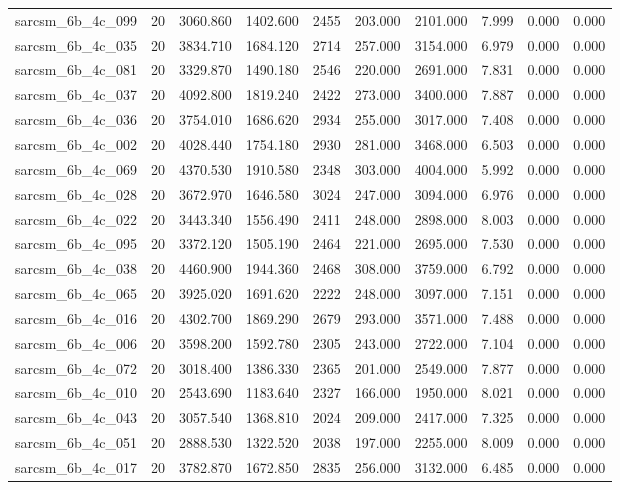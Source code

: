 \begin{tabular}{lrrrrrrrrr}
sarcsm\_6b\_4c\_099 & 20 & 3060.860 & 1402.600 & 2455 & 203.000 & 2101.000 & 7.999 & 0.000 & 0.000 \\
sarcsm\_6b\_4c\_035 & 20 & 3834.710 & 1684.120 & 2714 & 257.000 & 3154.000 & 6.979 & 0.000 & 0.000 \\
sarcsm\_6b\_4c\_081 & 20 & 3329.870 & 1490.180 & 2546 & 220.000 & 2691.000 & 7.831 & 0.000 & 0.000 \\
sarcsm\_6b\_4c\_037 & 20 & 4092.800 & 1819.240 & 2422 & 273.000 & 3400.000 & 7.887 & 0.000 & 0.000 \\
sarcsm\_6b\_4c\_036 & 20 & 3754.010 & 1686.620 & 2934 & 255.000 & 3017.000 & 7.408 & 0.000 & 0.000 \\
sarcsm\_6b\_4c\_002 & 20 & 4028.440 & 1754.180 & 2930 & 281.000 & 3468.000 & 6.503 & 0.000 & 0.000 \\
sarcsm\_6b\_4c\_069 & 20 & 4370.530 & 1910.580 & 2348 & 303.000 & 4004.000 & 5.992 & 0.000 & 0.000 \\
sarcsm\_6b\_4c\_028 & 20 & 3672.970 & 1646.580 & 3024 & 247.000 & 3094.000 & 6.976 & 0.000 & 0.000 \\
sarcsm\_6b\_4c\_022 & 20 & 3443.340 & 1556.490 & 2411 & 248.000 & 2898.000 & 8.003 & 0.000 & 0.000 \\
sarcsm\_6b\_4c\_095 & 20 & 3372.120 & 1505.190 & 2464 & 221.000 & 2695.000 & 7.530 & 0.000 & 0.000 \\
sarcsm\_6b\_4c\_038 & 20 & 4460.900 & 1944.360 & 2468 & 308.000 & 3759.000 & 6.792 & 0.000 & 0.000 \\
sarcsm\_6b\_4c\_065 & 20 & 3925.020 & 1691.620 & 2222 & 248.000 & 3097.000 & 7.151 & 0.000 & 0.000 \\
sarcsm\_6b\_4c\_016 & 20 & 4302.700 & 1869.290 & 2679 & 293.000 & 3571.000 & 7.488 & 0.000 & 0.000 \\
sarcsm\_6b\_4c\_006 & 20 & 3598.200 & 1592.780 & 2305 & 243.000 & 2722.000 & 7.104 & 0.000 & 0.000 \\
sarcsm\_6b\_4c\_072 & 20 & 3018.400 & 1386.330 & 2365 & 201.000 & 2549.000 & 7.877 & 0.000 & 0.000 \\
sarcsm\_6b\_4c\_010 & 20 & 2543.690 & 1183.640 & 2327 & 166.000 & 1950.000 & 8.021 & 0.000 & 0.000 \\
sarcsm\_6b\_4c\_043 & 20 & 3057.540 & 1368.810 & 2024 & 209.000 & 2417.000 & 7.325 & 0.000 & 0.000 \\
sarcsm\_6b\_4c\_051 & 20 & 2888.530 & 1322.520 & 2038 & 197.000 & 2255.000 & 8.009 & 0.000 & 0.000 \\
sarcsm\_6b\_4c\_017 & 20 & 3782.870 & 1672.850 & 2835 & 256.000 & 3132.000 & 6.485 & 0.000 & 0.000 \\

\end{tabular}
